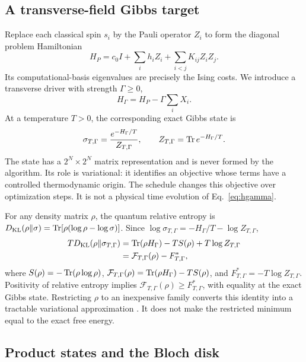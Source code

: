 \subsection{A transverse-field Gibbs target}

Replace each classical spin $s_i$ by the Pauli operator $Z_i$ to form the
diagonal problem Hamiltonian
\begin{equation}
 H_P=c_0 I+\sum_i h_i Z_i+\sum_{i<j}K_{ij}Z_iZ_j.
 \label{eq:hp}
\end{equation}
Its computational-basis eigenvalues are precisely the Ising costs. We
introduce a transverse driver with strength $\Gamma\geq0$,
\begin{equation}
 H_{\Gamma}=H_P-\Gamma\sum_i X_i.
 \label{eq:hgamma}
\end{equation}
At a temperature $T>0$, the corresponding exact Gibbs state is
\begin{equation}
 \sigma_{T,\Gamma}
 =\frac{e^{-H_{\Gamma}/T}}{Z_{T,\Gamma}},
 \qquad Z_{T,\Gamma}=\operatorname{Tr} e^{-H_{\Gamma}/T}.
 \label{eq:gibbs}
\end{equation}
The state has a $2^N\times2^N$ matrix representation and is never formed
by the algorithm. Its role is variational: it identifies an objective whose
terms have a controlled thermodynamic origin. The schedule changes this
objective over optimization steps. It is not a physical time evolution of
Eq.~\eqref{eq:hgamma}.

For any density matrix $\rho$, the quantum relative entropy is
$D_{\mathrm{KL}}(\rho\Vert\sigma)=\operatorname{Tr}[\rho(\log\rho-\log\sigma)]$. Since
$\log\sigma_{T,\Gamma}=-H_\Gamma/T-\log Z_{T,\Gamma}$,
\begin{align}
 TD_{\mathrm{KL}}(\rho\Vert\sigma_{T,\Gamma})
 &=\operatorname{Tr}(\rho H_\Gamma)-T S(\rho)
   +T\log Z_{T,\Gamma}\nonumber\\
 &=\mathcal F_{T,\Gamma}(\rho)-F^*_{T,\Gamma},
 \label{eq:klidentity}
\end{align}
where $S(\rho)=-\operatorname{Tr}(\rho\log\rho)$,
$\mathcal F_{T,\Gamma}(\rho)=\operatorname{Tr}(\rho H_\Gamma)-T S(\rho)$,
and $F^*_{T,\Gamma}=-T\log Z_{T,\Gamma}$. Positivity of relative entropy
implies $\mathcal F_{T,\Gamma}(\rho)\geq F^*_{T,\Gamma}$, with equality at
the exact Gibbs state. Restricting $\rho$ to an inexpensive family converts
this identity into a tractable variational approximation
\citep{nielsen2010,wainwright2008}. It does not make the restricted minimum
equal to the exact free energy.

\subsection{Product states and the Bloch disk}

